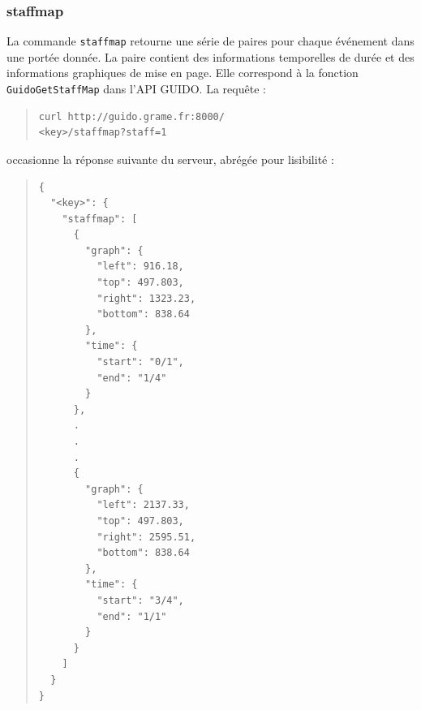 \documentclass{article}
\newcommand{\guidosize}{7pt}
\begin{document}
\subsubsection{staffmap}\label{subsection:staffmap}
La commande \verb=staffmap= retourne une série de paires pour chaque événement dans une portée donnée. La paire contient des informations temporelles de durée et des informations graphiques de mise en page. Elle correspond à la fonction \verb=GuidoGetStaffMap= dans l'API GUIDO. La requête :
\begin{quote}
\begingroup
\fontsize{\guidosize}{12pt}\selectfont
\begin{verbatim}
curl http://guido.grame.fr:8000/
<key>/staffmap?staff=1
\end{verbatim}
\endgroup
\end{quote}
occasionne la réponse suivante du serveur, abrégée pour lisibilité :
\begin{quote}
\begingroup
\fontsize{\guidosize}{12pt}\selectfont
\begin{verbatim}
{
  "<key>": {
    "staffmap": [
      {
        "graph": {
          "left": 916.18,
          "top": 497.803,
          "right": 1323.23,
          "bottom": 838.64
        },
        "time": {
          "start": "0/1",
          "end": "1/4"
        }
      },
      .
      .
      .
      {
        "graph": {
          "left": 2137.33,
          "top": 497.803,
          "right": 2595.51,
          "bottom": 838.64
        },
        "time": {
          "start": "3/4",
          "end": "1/1"
        }
      }
    ]
  }
}
\end{verbatim}
\endgroup
\end{quote}
\end{document}
